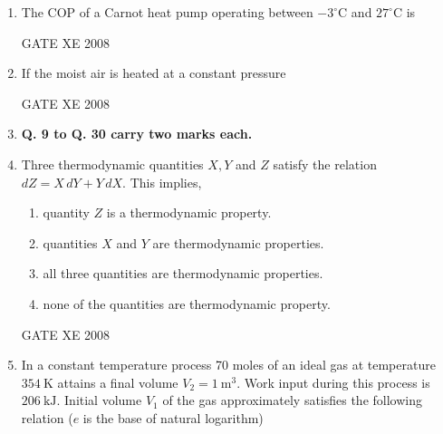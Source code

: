 \documentclass[12pt]{article}
\begin{document}
\begin{enumerate}
\item The COP of a Carnot heat pump operating between $-3^\circ\mathrm{C}$ and $27^\circ\mathrm{C}$ is  

\begin{enumerate}
\end{enumerate}

GATE XE 2008

\item If the moist air is heated at a constant pressure  

\begin{enumerate}
\end{enumerate}

GATE XE 2008

\item[] \textbf{Q. 9 to Q. 30 carry two marks each.}

\item Three thermodynamic quantities $X, Y$ and $Z$ satisfy the relation  
$dZ = X\, dY + Y\, dX.$
This implies,  
\begin{enumerate}
\item  quantity $Z$ is a thermodynamic property.
\item  quantities $X$ and $Y$ are thermodynamic properties. 
\item  all three quantities are thermodynamic properties. 
\item  none of the quantities are thermodynamic property. 
\end{enumerate}

GATE XE 2008

\item In a constant temperature process 70 moles of an ideal gas at temperature $354\ \mathrm{K}$ attains a final volume $V_2 = 1\ \mathrm{m^3}$. Work input during this process is $206\ \mathrm{kJ}$. Initial volume $V_1$ of the gas approximately satisfies the following relation ($e$ is the base of natural logarithm)  


\end{enumerate}
\end{document}
